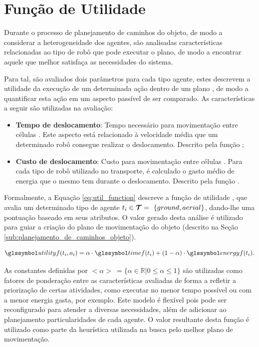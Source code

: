 
\section{Função de Utilidade} %
\label{sub:fun_o_de_avalia_o}

Durante o processo de planejamento de caminhos do objeto, de modo a considerar a heterogeneidade dos agentes, são analisadas características relacionadas ao tipo de robô que pode executar o plano, de modo a encontrar aquele que melhor satisfaça as necessidades do sistema.

Para tal, são avaliados dois parâmetros para cada tipo agente, estes descrevem a utilidade da execução de um determinada ação  dentro de um plano , de modo a quantificar esta ação em um aspecto passível de ser comparado.
As características a seguir são utilizadas na avaliação:

\begin{itemize}
  \item \textbf{Tempo de deslocamento}:
    Tempo necessário para movimentação entre células . Este aspecto está relacionado à velocidade média que um determinado robô consegue realizar o deslocamento. Descrito pela função ;
  \item \textbf{Custo de deslocamento}:
    Custo para movimentação entre células . Para cada tipo de robô utilizado no transporte, é calculado o gasto médio de energia que o mesmo tem durante o deslocamento. Descrito pela função .
\end{itemize}

Formalmente, a Equação \ref{eq:util_function} descreve a função de utilidade , que avalia um determinado tipo de agente $t_{i} \in \boldsymbol{\mathcal{T}}=\ \{ground, aerial\}$, dando-lhe uma pontuação baseado em seus atributos. O valor gerado desta análise é utilizado para guiar a criação do plano de movimentação do objeto (descrito na Seção \ref{sub:planejamento_de_caminhos_objeto}).

\begin{equation}
  \sy{utilityf}(\type{i}, \movementaction) = \alpha \cdot \sy{timef}(\type{i}) + (1-\alpha) \cdot \sy{energyf}(\type{i}).
  \label{eq:util_function}
\end{equation}

As constantes definidas por $<\alpha>\ =\{\alpha \in \mathbb{R} | 0 \leq \alpha \leq 1\}$ são utilizadas como fatores de ponderação entre as características avaliadas de forma a refletir a priorização de certas atividades, como executar no menor tempo possível ou com a menor energia gasta, por exemplo.
Este modelo é flexível pois pode ser reconfigurado para atender a diversas necessidades, além de adicionar ao planejamento particularidades de cada agente. O valor resultante desta função é utilizado como parte da heurística utilizada na busca pelo melhor plano de movimentação.

